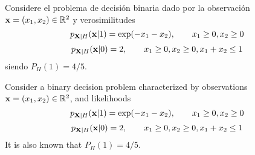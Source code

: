 \ifspanish

\question Considere el problema de decisión binaria dado por la observación ${\bf x} = (x_1,x_2) \in \mathbb{R}^2$ y verosimilitudes
\[
p_{{\bf X}|H}({\bf x}|1) = \exp(-x_1-x_2),  \qquad  x_1\ge 0, x_2 \ge 0
\]
\[
p_{{\bf X}|H}({\bf x}|0) = 2, \qquad  x_1\ge 0, x_2\ge 0, x_1+x_2 \le 1
\]
siendo $P_H(1)= 4/5$. 



\begin{solution}
\end{solution}

\else

\question Consider a binary decision problem characterized by observations ${\bf x} = (x_1,x_2) \in \mathbb{R}^2$, and likelihoods
\[
p_{{\bf X}|H}({\bf x}|1) = \exp(-x_1-x_2),  \qquad  x_1\ge 0, x_2 \ge 0
\]
\[
p_{{\bf X}|H}({\bf x}|0) = 2, \qquad  x_1\ge 0, x_2\ge 0, x_1+x_2 \le 1
\]
It is also known that $P_H(1)= 4/5$. 

